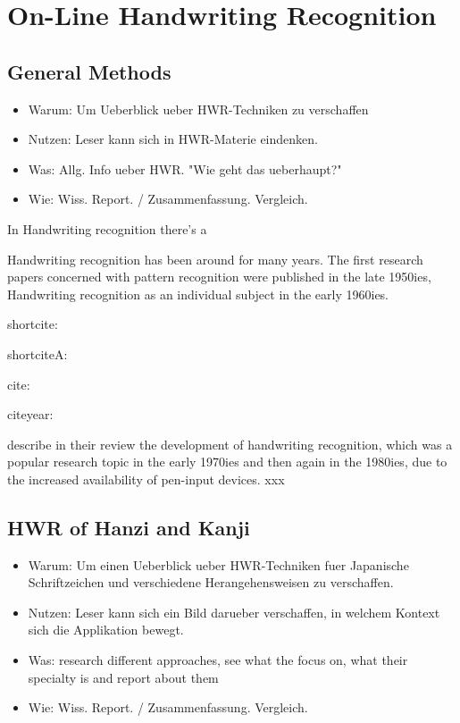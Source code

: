 \chapter{On-Line Handwriting Recognition}
\label{chap:onlinehwr}
  
\section{General Methods}
\label{sec:generalmethods}

\begin{itemize}
\item Warum: Um Ueberblick ueber HWR-Techniken zu verschaffen
\item Nutzen: Leser kann sich in HWR-Materie eindenken.
\item Was: Allg. Info ueber HWR. "Wie geht das ueberhaupt?"
\item Wie: Wiss. Report. / Zusammenfassung. Vergleich.
\end{itemize}

In Handwriting recognition there's a 

Handwriting recognition has been around for many years. The first research
papers concerned with pattern recognition were published in the late 1950ies, Handwriting recognition as an individual subject in the early 1960ies.

shortcite:  

shortciteA:  



cite: \cite{Tappert1990} 

citeyear: \citeyear{Tappert1990}

describe in their review the development of handwriting recognition, which was a popular research topic in the early 1970ies and then again in the 1980ies, due to the increased availability of pen-input devices.
xxx



\section{HWR of Hanzi and Kanji}
\begin{itemize}
\item Warum: Um einen Ueberblick ueber HWR-Techniken fuer Japanische 
  Schriftzeichen und verschiedene Herangehensweisen zu verschaffen.
\item Nutzen: Leser kann sich ein Bild darueber verschaffen,
  in welchem Kontext sich die Applikation bewegt.
\item Was: research different approaches, see what the focus on, 
  what their specialty is and report about them
\item Wie: Wiss. Report. / Zusammenfassung. Vergleich.
\end{itemize}

